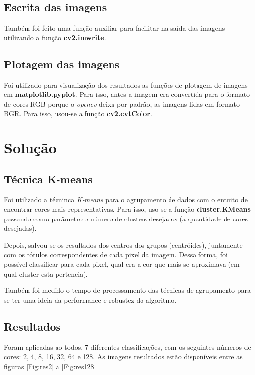 \documentclass{article}
\begin{document}
\subsection{Escrita das imagens}

Também foi feito uma função auxiliar para facilitar na saída das imagens utilizando a função \textbf{cv2.imwrite}. 

\subsection{Plotagem das imagens}

Foi utilizado para visualização dos resultados as funções de plotagem de imagens em \textbf{matplotlib.pyplot}. Para isso, antes a imagem era convertida para o formato de cores RGB porque o \textit{opencv} deixa por padrão, as imagens lidas em formato BGR. Para isso, usou-se a função \textbf{cv2.cvtColor}.

\section{Solução}

\subsection{Técnica K-means}

Foi utilizado a técninca \textit{K-means} para o agrupamento de dados com o entuito de encontrar cores mais representativas. Para isso, uso-se a função \textbf{cluster.KMeans} passando como parâmetro o número de clusters desejados (a quantidade de cores desejadas).

Depois, salvou-se os resultados dos centros dos grupos (centróides), juntamente com os rótulos correspondentes de cada pixel da imagem. Dessa forma, foi possível classificar para cada pixel, qual era a cor que mais se aproximava (em qual cluster esta pertencia).

Também foi medido o tempo de processamento das técnicas de agrupamento para se ter uma ideia da performance e robustez do algoritmo.

\subsection{Resultados}

Foram aplicadas ao todos, 7 diferentes classificações, com os seguintes números de cores: 2, 4, 8, 16, 32, 64 e 128. As imagens resultados estão disponíveis entre as figuras \ref{Fig:res2} a \ref{Fig:res128}
\end{document}
